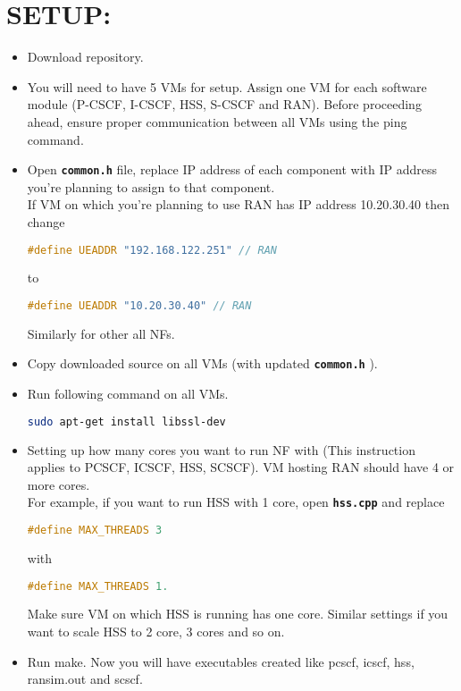 \documentclass[hidelinks]{report}
\newcommand{\cf}[1] {
	\textbf{\texttt{#1}}
}
\begin{document}
\section*{SETUP:}
\begin{itemize}
\item Download repository.
\item You will need to have 5 VMs for setup. Assign one VM for each software module (P-CSCF, I-CSCF, HSS, S-CSCF and RAN). Before proceeding ahead, ensure proper communication between all VMs using the ping command. 
\item Open \cf{common.h} file, replace IP address of each component with IP address you're planning to assign to that component. \\
If VM on which you're planning to use RAN has IP address 10.20.30.40 then change \ 
\begin{lstlisting}[language=c]
#define UEADDR "192.168.122.251" // RAN 
\end{lstlisting}
to 

\begin{lstlisting}[language=c]
#define UEADDR "10.20.30.40" // RAN \end{lstlisting}

Similarly for other all NFs. 

\item Copy downloaded source on all VMs (with updated \cf{common.h}). 
\item Run following command on all VMs.
\begin{lstlisting}[language=bash]
sudo apt-get install libssl-dev 
\end{lstlisting}
\item  Setting up how many cores you want to run NF with (This instruction applies to PCSCF, ICSCF, HSS, SCSCF). VM hosting RAN should have 4 or more cores.\\
For example, if you want to run HSS with 1 core, open \cf{hss.cpp} and replace 
\begin{lstlisting}[language=c]
#define MAX_THREADS 3 \end{lstlisting}
with
\begin{lstlisting}[language=c]
#define MAX_THREADS 1.\end{lstlisting}
Make sure VM on which HSS is running has one core. Similar settings if you want to scale HSS to 2 core, 3 cores and so on. 
\item  Run make. Now you will have executables created like pcscf, icscf, hss, ransim.out and scscf.
\end{itemize}
\end{document}
